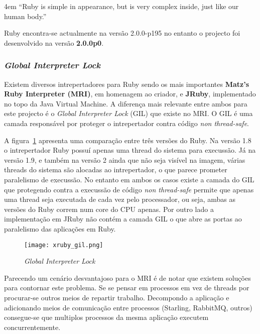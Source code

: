 \begingroup
\leftskip4em
\rightskip\leftskip
``Ruby is simple in appearance, but is very complex inside, just like our human body.'' \cite{matz}
\par
\endgroup

Ruby encontra-se actualmente na versão 2.0.0-p195 no entanto o projecto foi desenvolvido na versão \textbf{2.0.0p0}.

\subsubsection{\textit{Global Interpreter Lock}}
\label{sec:gil}

Existem diversos intrepertadores para Ruby sendo os mais importantes \textbf{Matz's Ruby Interpreter (MRI)}, em homenagem ao criador, e \textbf{JRuby}, implementado no topo da Java Virtual Machine.
A diferença mais relevante entre ambos para este projecto é o \textit{Global Interpreter Lock} (GIL) que existe no MRI. O GIL é uma camada responsável por proteger o intrepertador contra código \textit{non thread-safe}.

A figura~\ref{fig:ruby-gil} apresenta uma comparação entre três versões do Ruby. Na versão 1.8 o intrepertador Ruby possuí apenas uma thread do sistema para execussão. Já na versão 1.9, e também na versão 2 ainda que não seja visível na imagem, várias threads do sistema são alocadas ao intrepertador, o que parece prometer paralelismo de execussão. No entanto em ambos os casos existe a camada do GIL que protegendo contra a execussão de código \textit{non thread-safe} permite que apenas uma thread seja executada de cada vez pelo processador, ou seja, ambas as versões do Ruby correm num core do CPU apenas.
Por outro lado a implementação em JRuby não contém a camada GIL o que abre as portas ao paralelismo das aplicações em Ruby.

\begin{figure}[H]
\centering
\texttt{[image: xruby\_gil.png]}
\caption{\textit{Global Interpreter Lock}}
\label{fig:ruby-gil}
\end{figure}

Parecendo um cenário desvantajoso para o MRI é de notar que existem soluções para contornar este problema. Se se pensar em processos em vez de threads por procurar-se outros meios de repartir trabalho. Decompondo a aplicação e adicionando meios de comunicação entre processos (Starling, RabbitMQ, outros) consegue-se que multiplos processos da mesma aplicação executem concurrentemente.
